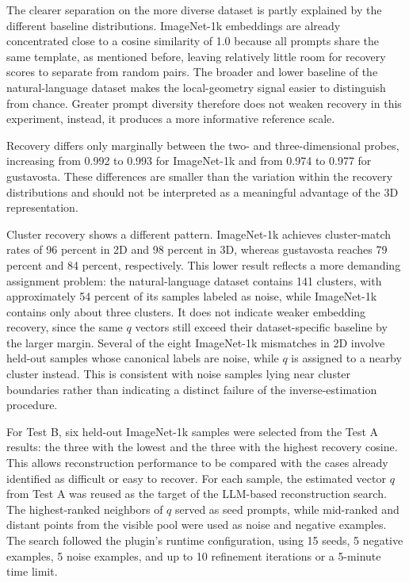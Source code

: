 The clearer separation on the more diverse dataset is partly explained by the different baseline distributions. ImageNet-1k embeddings are already concentrated close to a cosine similarity of 1.0 because all prompts share the same template, as mentioned before, leaving relatively little room for recovery scores to separate from random pairs. The broader and lower baseline of the natural-language dataset makes the local-geometry signal easier to distinguish from chance. Greater prompt diversity therefore does not weaken recovery in this experiment, instead, it produces a more informative reference scale.

Recovery differs only marginally between the two- and three-dimensional probes, increasing from 0.992 to 0.993 for ImageNet-1k and from 0.974 to 0.977 for gustavosta. These differences are smaller than the variation within the recovery distributions and should not be interpreted as a meaningful advantage of the 3D representation.

Cluster recovery shows a different pattern. ImageNet-1k achieves cluster-match rates of 96 percent in 2D and 98 percent in 3D, whereas gustavosta reaches 79 percent and 84 percent, respectively. This lower result reflects a more demanding assignment problem: the natural-language dataset contains 141 clusters, with approximately 54 percent of its samples labeled as noise, while ImageNet-1k contains only about three clusters. It does not indicate weaker embedding recovery, since the same $q$ vectors still exceed their dataset-specific baseline by the larger margin. Several of the eight ImageNet-1k mismatches in 2D involve held-out samples whose canonical labels are noise, while $q$ is assigned to a nearby cluster instead. This is consistent with noise samples lying near cluster boundaries rather than indicating a distinct failure of the inverse-estimation procedure.

For Test B, six held-out ImageNet-1k samples were selected from the Test A results: the three with the lowest and the three with the highest recovery cosine. This allows reconstruction performance to be compared with the cases already identified as difficult or easy to recover. For each sample, the estimated vector $q$ from Test A was reused as the target of the LLM-based reconstruction search. The highest-ranked neighbors of $q$ served as seed prompts, while mid-ranked and distant points from the visible pool were used as noise and negative examples. The search followed the plugin's runtime configuration, using 15 seeds, 5 negative examples, 5 noise examples, and up to 10 refinement iterations or a 5-minute time limit.


